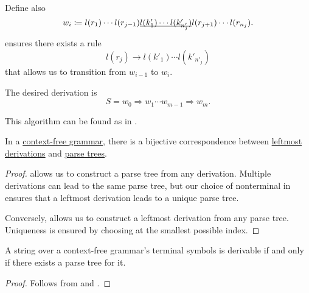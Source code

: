 \begin{algorithm}
\begin{thmenum}
\begin{itemize}
      Define also
      \begin{equation*}
        w_i \coloneqq l(r_1) \cdots l(r_{j-1}) \underline{\smash{ l(k'_1) \cdots l(k'_{n'_j}) }} l(r_{j+1}) \cdots l(r_{n_j}).
      \end{equation*}

       ensures there exists a rule
      \begin{equation*}
        l(r_j) \to l(k'_1) \cdots l(k'_{n'_j})
      \end{equation*}
      that allows us to transition from \( w_{i-1} \) to \( w_i \).
    \end{itemize}

     The desired derivation is
    \begin{equation*}
      S = w_0 \Rightarrow w_1 \cdots w_{m-1} \Rightarrow w_m.
    \end{equation*}
  \end{thmenum}
\end{algorithm}
\begin{comments}
  \item This algorithm can be found as  in \cite{code}.
\end{comments}

\begin{proposition}\label{thm:derivations_and_parse_trees}
  In a \hyperref[def:chomsky_hierarchy/context_free]{context-free grammar}, there is a bijective correspondence between \hyperref[def:leftmost_derivation]{leftmost derivations} and \hyperref[def:parse_tree]{parse trees}.
\end{proposition}
\begin{proof}
   allows us to construct a parse tree from any derivation. Multiple derivations can lead to the same parse tree, but our choice of nonterminal in  ensures that a leftmost derivation leads to a unique parse tree.

  Conversely,  allows us to construct a leftmost derivation from any parse tree. Uniqueness is ensured by choosing at  the smallest possible index.
\end{proof}

\begin{corollary}\label{thm:parse_tree_existence}
   A string over a context-free grammar's terminal symbols is derivable if and only if there exists a parse tree for it.
\end{corollary}
\begin{proof}
  Follows from  and .
\end{proof}


